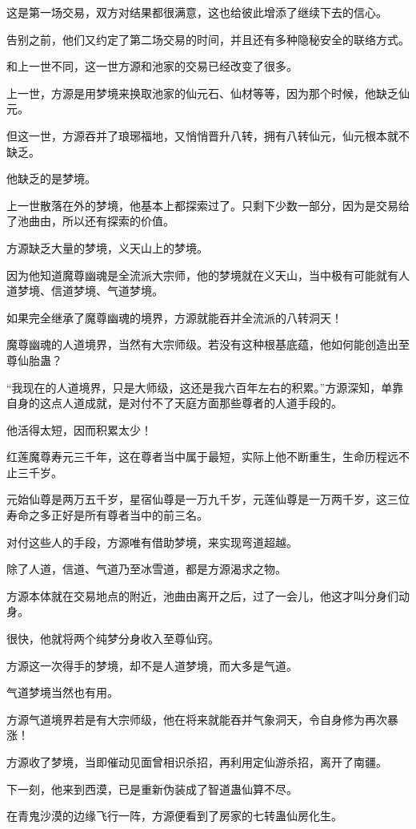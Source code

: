 \begin{this_body}
这是第一场交易，双方对结果都很满意，这也给彼此增添了继续下去的信心。

告别之前，他们又约定了第二场交易的时间，并且还有多种隐秘安全的联络方式。

和上一世不同，这一世方源和池家的交易已经改变了很多。

上一世，方源是用梦境来换取池家的仙元石、仙材等等，因为那个时候，他缺乏仙元。

但这一世，方源吞并了琅琊福地，又悄悄晋升八转，拥有八转仙元，仙元根本就不缺乏。

他缺乏的是梦境。

上一世散落在外的梦境，他基本上都探索过了。只剩下少数一部分，因为是交易给了池曲由，所以还有探索的价值。

方源缺乏大量的梦境，义天山上的梦境。

因为他知道魔尊幽魂是全流派大宗师，他的梦境就在义天山，当中极有可能就有人道梦境、信道梦境、气道梦境。

如果完全继承了魔尊幽魂的境界，方源就能吞并全流派的八转洞天！

魔尊幽魂的人道境界，当然有大宗师级。若没有这种根基底蕴，他如何能创造出至尊仙胎蛊？

“我现在的人道境界，只是大师级，这还是我六百年左右的积累。”方源深知，单靠自身的这点人道成就，是对付不了天庭方面那些尊者的人道手段的。

他活得太短，因而积累太少！

红莲魔尊寿元三千年，这在尊者当中属于最短，实际上他不断重生，生命历程远不止三千岁。

元始仙尊是两万五千岁，星宿仙尊是一万九千岁，元莲仙尊是一万两千岁，这三位寿命之多正好是所有尊者当中的前三名。

对付这些人的手段，方源唯有借助梦境，来实现弯道超越。

除了人道，信道、气道乃至冰雪道，都是方源渴求之物。

方源本体就在交易地点的附近，池曲由离开之后，过了一会儿，他这才叫分身们动身。

很快，他就将两个纯梦分身收入至尊仙窍。

方源这一次得手的梦境，却不是人道梦境，而大多是气道。

气道梦境当然也有用。

方源气道境界若是有大宗师级，他在将来就能吞并气象洞天，令自身修为再次暴涨！

方源收了梦境，当即催动见面曾相识杀招，再利用定仙游杀招，离开了南疆。

下一刻，他来到西漠，已是重新伪装成了智道蛊仙算不尽。

在青鬼沙漠的边缘飞行一阵，方源便看到了房家的七转蛊仙房化生。


\end{this_body}
